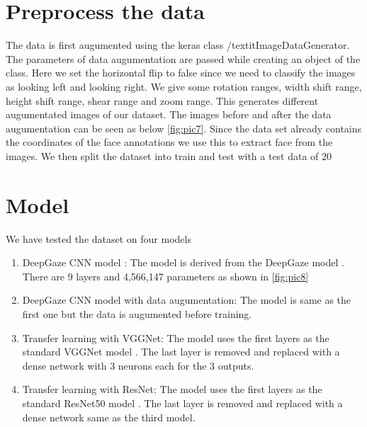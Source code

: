 \documentclass[a4paper, 12pt, oneside, BCOR1cm,toc=chapterentrywithdots]{scrbook}
\begin{document}
 



\section{Preprocess the data}

The data is first augumented using the keras class /textit{ImageDataGenerator}. The parameters of data augumentation are passed while creating an object of the class. Here we set the horizontal flip to false since we need to classify the images as looking left and looking right. We give some rotation ranges, width shift range, height shift range, shear range and zoom range. This generates different augumentated images of our dataset. The images before and after the data augumentation can be seen as below \ref{fig:pic7}. Since the data set already contains the coordinates of the face annotations we use this to extract face from the images. We then split the dataset into train and test with a test data of 20%





\section{Model}

We have tested the dataset on four models

\begin{enumerate}
	\item DeepGaze CNN model : The model is derived from the DeepGaze model \cite{noauthor_head_nodate}. There are 9 layers and 4,566,147 parameters as shown in \ref{fig:pic8} 
	\item DeepGaze CNN model with data augumentation: The model is same as the first one but the data is augumented before training. 
	\item Transfer learning with VGGNet: The model uses the first layers as the standard VGGNet model \cite{}. The last layer is removed and replaced with a dense network with 3 neurons each for the 3 outputs.
	\item Transfer learning with ResNet: The model uses the first layers as the standard ResNet50 model \cite{}. The last layer is removed and replaced with a dense network same as the third model.
\end{enumerate}
\end{document}
